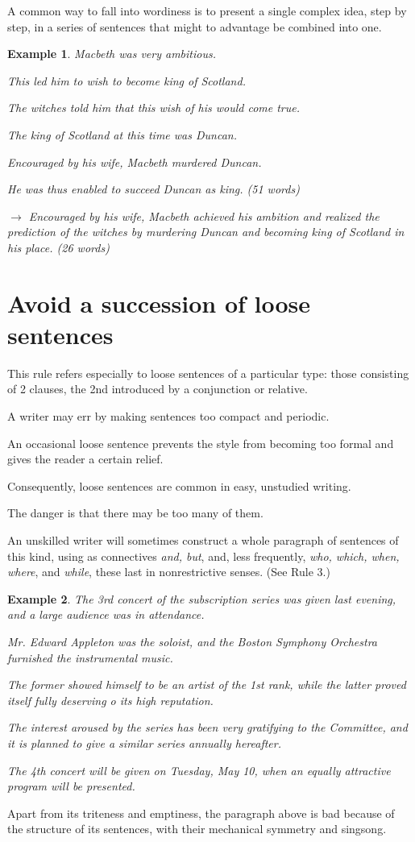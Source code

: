 \documentclass{book}
\numberwithin{equation}{section}
\newtheorem{example}{Example}[chapter]
\begin{document}
%
A common way to fall into wordiness is to present a single complex idea, step by step, in a series of sentences that might to advantage be combined into one.
\begin{example}
    Macbeth was very ambitious.
    
    This led him to wish to become king of Scotland.
    
    The witches told him that this wish of his would come true.
    
    The king of Scotland at this time was Duncan.
    
    Encouraged by his wife, Macbeth murdered Duncan.
    
    He was thus enabled to succeed Duncan as king. (51 words)
    
    $\to$ Encouraged by his wife, Macbeth achieved his ambition and realized the prediction of the witches by murdering Duncan and becoming king of Scotland in his place. (26 words)
\end{example}

\section{Avoid a succession of loose sentences}
This rule refers especially to loose sentences of a particular type: those consisting of 2 clauses, the 2nd introduced by a conjunction or relative.

A writer may err by making sentences too compact and periodic.

An occasional loose sentence prevents the style from becoming too formal and gives the reader a certain relief.

Consequently, loose sentences are common in easy, unstudied writing.

The danger is that there may be too many of them.

%
An unskilled writer will sometimes construct a whole paragraph of sentences of this kind, using as connectives \textit{and, but}, and, less frequently, \textit{who, which, when, where}, and \textit{while}, these last in nonrestrictive senses. (See Rule 3.)
\begin{example}
    The 3rd concert of the subscription series was given last evening, and a large audience was in attendance.
    
    Mr. Edward Appleton was the soloist, and the Boston Symphony Orchestra furnished the instrumental music.
    
    The former showed himself to be an artist of the 1st rank, while the latter proved itself fully deserving o its high reputation.
    
    The interest aroused by the series has been very gratifying to the Committee, and it is planned to give a similar series annually hereafter.
    
    The 4th concert will be given on Tuesday, May 10, when an equally attractive program will be presented.
\end{example}
Apart from its triteness and emptiness, the paragraph above is bad because of the structure of its sentences, with their mechanical symmetry and singsong.
\end{document}
